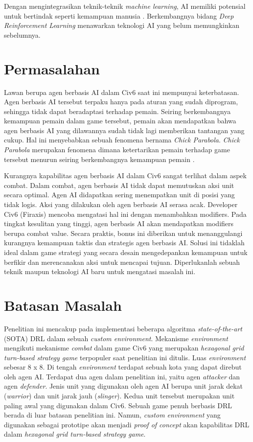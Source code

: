 Dengan mengintegrasikan teknik-teknik \emph{machine learning}, AI memiliki potensial untuk bertindak seperti kemampuan manusia \citep{humanLevelAI}.
Berkembangnya bidang \emph{Deep Reinforcement Learning} menawarkan teknologi AI yang belum memungkinkan sebelumnya. 

\section{Permasalahan}
\label{sec:permasalahan}

Lawan berupa agen berbasis AI dalam Civ6 saat ini mempunyai keterbatasan. 
Agen berbasis AI tersebut terpaku hanya pada aturan yang sudah diprogram, 
sehingga tidak dapat beradaptasi terhadap pemain. 
Seiring berkembangnya kemampuan pemain dalam game tersebut, 
pemain akan mendapatkan bahwa agen berbasis AI yang dilawannya sudah tidak lagi 
memberikan tantangan yang cukup. Hal ini menyebabkan sebuah fenomena bernama \emph{Chick Parabola}. 
\emph{Chick Parabola} merupakan fenomena dimana ketertarikan pemain terhadap game tersebut menurun seiring berkembangnya kemampuan pemain \citep{chickParabola}.

Kurangnya kapabilitas agen berbasis AI dalam Civ6 sangat terlihat dalam aspek combat. Dalam combat, agen berbasis AI tidak dapat memutuskan aksi unit secara optimal. Agen AI didapatkan sering menempatkan unit di posisi yang tidak logis. 
Aksi yang dilakukan oleh agen berbasis AI serasa acak. 
Developer Civ6 (Firaxis) mencoba mengatasi hal ini dengan menambahkan modifiers. 
Pada tingkat kesulitan yang tinggi, agen berbasis AI akan mendapatkan modifiers berupa combat value. Secara praktis, bonus ini diberikan untuk menanggulangi kurangnya kemampuan taktis dan strategis agen berbasis AI. 
Solusi ini tidaklah ideal dalam game strategi yang secara desain mengedepankan kemampuan untuk berfikir dan merencanakan aksi untuk mencapai tujuan.
Diperlukanlah sebuah teknik maupun teknologi AI baru untuk mengatasi masalah ini.

\section{Batasan Masalah}
\label{sec:batasanmasalah}

Penelitian ini mencakup pada implementasi beberapa algoritma \emph{state-of-the-art} (SOTA) DRL dalam sebuah \emph{custom environment}. 
Mekanisme \emph{environment} mengikuti mekanisme \emph{combat} dalam game Civ6 yang merupakan \emph{hexagonal grid turn-based strategy game} terpopuler saat penelitian ini ditulis. 
Luas \emph{environment} sebesar 8 x 8. Di tengah \emph{environment} terdapat sebuah kota yang dapat direbut oleh agen AI. Terdapat dua agen dalam penelitian ini, yaitu agen \emph{attacker} dan agen \emph{defender}. 
Jenis unit yang digunakan oleh agen AI berupa unit jarak dekat (\emph{warrior}) dan unit jarak jauh (\emph{slinger}). Kedua unit tersebut merupakan unit paling awal yang digunakan dalam Civ6.
Sebuah game penuh berbasis DRL berada di luar batasan penelitian ini. Namun, \emph{custom environment} yang digunakan sebagai prototipe akan menjadi \emph{proof of concept}
akan kapabilitas DRL dalam \emph{hexagonal grid turn-based strategy game}.

